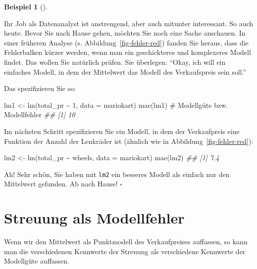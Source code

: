 \documentclass[
  letterpaper,
  oneside,
  open=any]{scrbook}
\newenvironment{Shaded}{\begin{snugshade}}{\end{snugshade}}
\newcommand{\AttributeTok}[1]{\textcolor[rgb]{0.40,0.45,0.13}{#1}}
\newcommand{\CommentTok}[1]{\textcolor[rgb]{0.37,0.37,0.37}{#1}}
\newcommand{\DecValTok}[1]{\textcolor[rgb]{0.68,0.00,0.00}{#1}}
\newcommand{\DocumentationTok}[1]{\textcolor[rgb]{0.37,0.37,0.37}{\textit{#1}}}
\newcommand{\FunctionTok}[1]{\textcolor[rgb]{0.28,0.35,0.67}{#1}}
\newcommand{\NormalTok}[1]{\textcolor[rgb]{0.00,0.23,0.31}{#1}}
\newcommand{\OtherTok}[1]{\textcolor[rgb]{0.00,0.23,0.31}{#1}}
\newcommand{\SpecialCharTok}[1]{\textcolor[rgb]{0.37,0.37,0.37}{#1}}
\theoremstyle{definition}
\theoremstyle{definition}
\newtheorem{example}{Beispiel}[chapter]
\theoremstyle{definition}
\theoremstyle{remark}
\begin{document}
\begin{example}[]\protect\hypertarget{exm-gruppen-mw}{}\label{exm-gruppen-mw}

Ihr Job als Datenanalyst ist anstrengend, aber auch mitunter
interessant. So auch heute. Bevor Sie nach Hause gehen, möchten Sie noch
eine Sache anschauen. In einer früheren Analyse (s.
Abbildung~\ref{fig-fehler-red}) fanden Sie heraus, dass die Fehlerbalken
kürzer werden, wenn man ein geschickteres und komplexeres Modell findet.
Das wollen Sie natürlich prüfen. Sie überlegen: \enquote{Okay, ich will
ein einfaches Modell, in dem der Mittelwert das Modell des Verkaufspreis
sein soll.}

Das spezifizieren Sie so:

\begin{Shaded}
\begin{Highlighting}[]
\NormalTok{lm1 }\OtherTok{\textless{}{-}} \FunctionTok{lm}\NormalTok{(total\_pr }\SpecialCharTok{\textasciitilde{}} \DecValTok{1}\NormalTok{, }\AttributeTok{data =}\NormalTok{ mariokart)}
\FunctionTok{mae}\NormalTok{(lm1)  }\CommentTok{\# Modellgüte bzw. Modellfehler}
\DocumentationTok{\#\# [1] 10}
\end{Highlighting}
\end{Shaded}

Im nächsten Schritt spezifizieren Sie ein Modell, in dem der
Verkaufpreis eine Funktion der Anzahl der Lenkräder ist (ähnlich wie in
Abbildung~\ref{fig-fehler-red}):

\begin{Shaded}
\begin{Highlighting}[]
\NormalTok{lm2 }\OtherTok{\textless{}{-}} \FunctionTok{lm}\NormalTok{(total\_pr }\SpecialCharTok{\textasciitilde{}}\NormalTok{ wheels, }\AttributeTok{data =}\NormalTok{ mariokart)}
\FunctionTok{mae}\NormalTok{(lm2)}
\DocumentationTok{\#\# [1] 7.4}
\end{Highlighting}
\end{Shaded}

Ah! Sehr schön, Sie haben mit \texttt{lm2} ein besseres Modell als
einfach nur den Mittelwert gefunden. Ab nach Hause! \(\square\)

\end{example}

\section{Streuung als Modellfehler}\label{streuung-als-modellfehler}

Wenn wir den Mittelwert als Punktmodell des Verkaufpreises auffassen, so
kann man die verschiedenen Kennwerte der Streuung als verschiedene
Kennwerte der Modellgüte auffassen.
\end{document}
